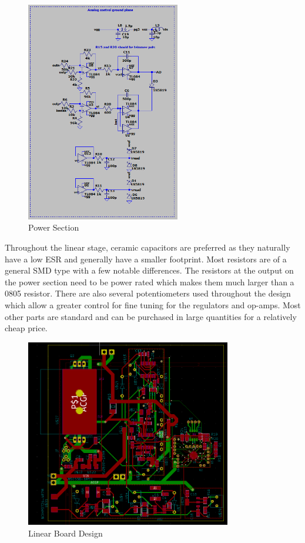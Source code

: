 \documentclass[12pt]{article}
\begin{document}
\begin{figure}[H]
    \centering
    \includegraphics[width=0.6\textwidth]{chase5}
    \caption{Power Section}
    \label{fig:chase5}
\end{figure}

Throughout the linear stage, ceramic capacitors are preferred as they naturally have a low ESR and generally have a smaller footprint. Most resistors are of a general SMD type with a few notable differences. The resistors at the output on the power section need to be power rated which makes them much larger than a 0805 resistor. There are also several potentiometers used throughout the design which allow a greater control for fine tuning for the regulators and op-amps. Most other parts are standard and can be purchased in large quantities for a relatively cheap price.\\


\begin{figure}[H]
    \centering
    \includegraphics[width=0.8\textwidth]{chase6}
    \caption{Linear Board Design}
    \label{fig:chase6}
\end{figure}
\pagebreak
\end{document}
